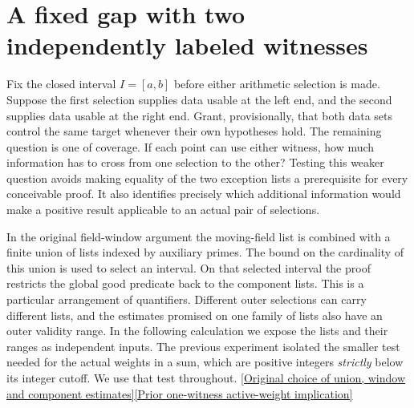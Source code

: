 \documentclass[12pt,letterpaper]{article}
\begin{document}
\section{A fixed gap with two independently labeled witnesses}
\label{sec:twoscreens}
Fix the closed interval \(I=[a,b]\) before either arithmetic selection is made. Suppose the first selection supplies data usable at the left end, and the second supplies data usable at the right end. Grant, provisionally, that both data sets control the same target whenever their own hypotheses hold. The remaining question is one of coverage. If each point can use either witness, how much information has to cross from one selection to the other? Testing this weaker question avoids making equality of the two exception lists a prerequisite for every conceivable proof. It also identifies precisely which additional information would make a positive result applicable to an actual pair of selections.

In the original field-window argument the moving-field list is combined with a finite union of lists indexed by auxiliary primes. The bound on the cardinality of this union is used to select an interval. On that selected interval the proof restricts the global good predicate back to the component lists. This is a particular arrangement of quantifiers. Different outer selections can carry different lists, and the estimates promised on one family of lists also have an outer validity range. In the following calculation we expose the lists and their ranges as independent inputs. The previous experiment isolated the smaller test needed for the actual weights in a sum, which are positive integers \emph{strictly} below its integer cutoff. We use that test throughout. \href{https://github.com/nousentllc/riemann-hypothesis/blob/40e56bab026552e089d7afcfeff08d2defb9c005/src/Development/AutomorphicArithmetic/AutomorphicVarieties/LayeredIsomorphisms/ThmBabOf.lean#L77-L103}{[Original choice of union, window and component estimates]}\quad\href{https://github.com/nousentllc/riemann-hypothesis/blob/d79bd956c6fb2b8a3de51b606765be81d24fb1fc/research/uriel/experiments/cofinal-endpoint-certificates/evidence/collar/FieldEndpoints.lean#L363-L391}{[Prior one-witness active-weight implication]}
\end{document}
